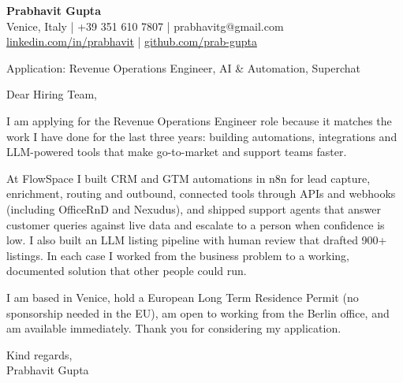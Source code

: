 \documentclass[a4paper,11pt]{article}
\begin{document}
\textbf{Prabhavit Gupta}\\
Venice, Italy | +39 351 610 7807 | prabhavitg@gmail.com\\
\href{https://www.linkedin.com/in/prabhavit/}{linkedin.com/in/prabhavit} | \href{https://github.com/prab-gupta}{github.com/prab-gupta}

Application: Revenue Operations Engineer, AI \& Automation, Superchat

Dear Hiring Team,

I am applying for the Revenue Operations Engineer role because it matches the work I have done for the last three years: building automations, integrations and LLM-powered tools that make go-to-market and support teams faster.

At FlowSpace I built CRM and GTM automations in n8n for lead capture, enrichment, routing and outbound, connected tools through APIs and webhooks (including OfficeRnD and Nexudus), and shipped support agents that answer customer queries against live data and escalate to a person when confidence is low. I also built an LLM listing pipeline with human review that drafted 900+ listings. In each case I worked from the business problem to a working, documented solution that other people could run.

I am based in Venice, hold a European Long Term Residence Permit (no sponsorship needed in the EU), am open to working from the Berlin office, and am available immediately. Thank you for considering my application.

Kind regards,\\
Prabhavit Gupta
\end{document}
